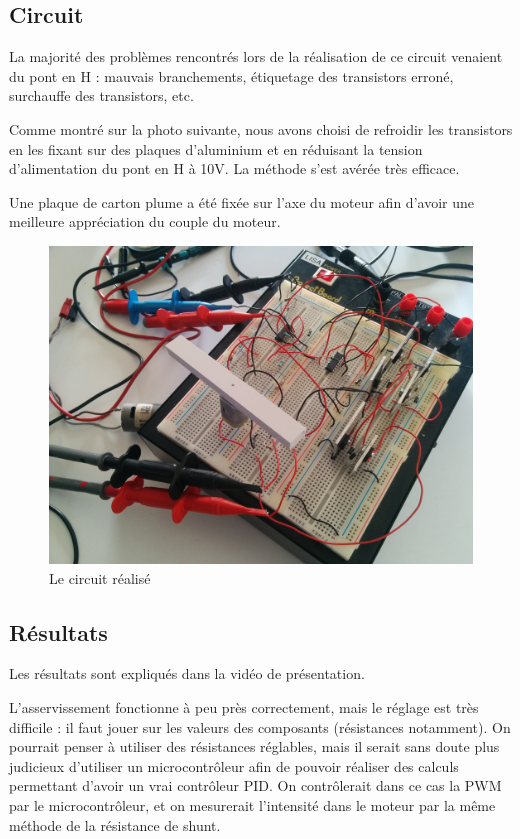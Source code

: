 \documentclass[a4paper]{article}
\begin{document}
\subsection{Circuit}

La majorité des problèmes rencontrés lors de la réalisation de ce circuit venaient du pont en H : mauvais branchements, étiquetage des transistors erroné, surchauffe des transistors, etc.

Comme montré sur la photo suivante, nous avons choisi de refroidir les transistors en les fixant sur des plaques d'aluminium et en réduisant la tension d'alimentation du pont en H à 10V. La méthode s'est avérée très efficace.

Une plaque de carton plume a été fixée sur l'axe du moteur afin d'avoir une meilleure appréciation du couple du moteur.

\begin{figure}[H]
  \centering
    \includegraphics[width=1\textwidth]{circuit}
  \caption{Le circuit réalisé}
\end{figure}

\subsection{Résultats}

Les résultats sont expliqués dans la vidéo de présentation. 

L'asservissement fonctionne à peu près correctement, mais le réglage est très difficile : il faut jouer sur les valeurs des composants (résistances notamment). On pourrait penser à utiliser des résistances réglables, mais il serait sans doute plus judicieux d'utiliser un microcontrôleur afin de pouvoir réaliser des calculs permettant d'avoir un vrai contrôleur PID. On contrôlerait dans ce cas la PWM par le microcontrôleur, et on mesurerait l'intensité dans le moteur par la même méthode de la résistance de shunt.\\
\end{document}
